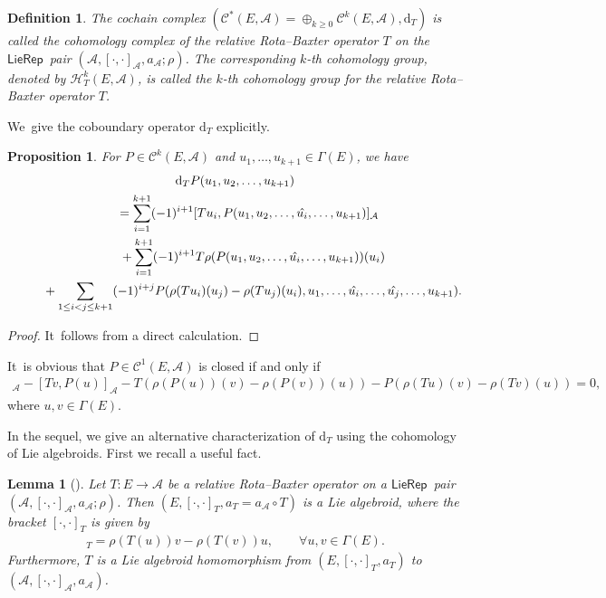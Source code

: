\documentclass[10pt,a4paper]{amsart}
\numberwithin{equation}{section}
\newtheorem{lem}[thm]{Lemma}
\newtheorem{pro}[thm]{Proposition}
\newtheorem{defi}[thm]{Definition}
\newcommand{\huaA}{\mathcal{A}}
\newcommand{\huaC}{\mathcal{C}}
\newcommand{\huaH}{\mathcal{H}}
\newcommand{\dM}{\mathrm{d}}
\newcommand{\LP}{$\mathsf{LieRep}$~}
\begin{document}
\begin{defi}\label{defi:cohomology of RB-operator}
The cochain complex $(\huaC^*(E,\huaA)=\oplus_{k\geq0}\huaC^k(E,\huaA),\dM_{T})$ is called
the {\it cohomology complex} of the relative Rota--Baxter operator $T$ on the \LP pair $(\huaA,[\cdot,\cdot]_\huaA,a_\huaA;\rho)$. The corresponding $k$-th cohomology group, denoted by $\huaH_{T}^k(E,\huaA)$, is called the {\it $k$-th cohomology group} for the relative Rota--Baxter operator $T$.
\end{defi}

We~give the coboundary operator $\dM_{T}$ explicitly.

\begin{pro}\label{pro:concret formula}
 For $P\in\huaC^k(E,\huaA)$ and $u_1,\dots,u_{k+1}\in\Gamma{(E)}$, we have
\begin{gather}
\dM_{T}P(u_1,u_2,\dots,u_{k+1})\nonumber
\\ \qquad
{}=\sum_{i=1}^{k+1}(-1)^{i+1}[Tu_i,P(u_1,u_2,\dots,\hat{u_i},\dots,u_{k+1})]_{\huaA}\nonumber
\\ \qquad\hphantom{=}
{}+\sum_{i=1}^{k+1}(-1)^{i+1}T\rho(P(u_1,u_2,\dots,\hat{u_i},\dots,u_{k+1}))(u_i)\nonumber
\\ \qquad\hphantom{=}
{}+\sum_{1\leq i<j\leq {k+1}}(-1)^{i+j}P(\rho(Tu_i)(u_j)-\rho(Tu_j)(u_i),u_1,\dots,\hat{u_i},\dots,\hat{u_j},\dots,u_{k+1}).
\label{eq:coboundary operator of RB-operator}
\end{gather}
\end{pro}

\begin{proof}
 It~follows from a direct calculation.
\end{proof}

It~is obvious that $P\in\huaC^1(E,\huaA)$ is closed if and only if
\begin{gather*}
[Tu,P(v)]_{\huaA}-[Tv,P(u)]_{\huaA}-T(\rho(P(u))(v)-\rho(P(v))(u))-P(\rho(Tu)(v)-\rho(Tv)(u))=0,
\end{gather*}
where $u,v\in\Gamma(E)$.

In the sequel, we give an alternative characterization of $\dM_{T}$ using the cohomology of Lie algebroids. First we recall a useful fact.

\begin{lem}[\cite{LiuShengBaiChen}]\label{lem:new Lie algebroid}
 Let $T\colon E\longrightarrow \huaA$ be a relative Rota--Baxter operator on a \LP pair $(\huaA,[\cdot,\cdot]_\huaA,a_\huaA;\rho)$. Then $(E,[\cdot,\cdot]_T,a_T=a_\huaA\circ T)$ is a Lie algebroid, where the bracket $[\cdot,\cdot]_T$ is given by
 \begin{gather*}
 [u,v]_T=\rho(T(u))v-\rho(T(v))u,\qquad\forall u,v\in\Gamma(E).
 \end{gather*}
 Furthermore, $T$ is a Lie algebroid homomorphism from $(E,[\cdot,\cdot]_T,a_T)$ to $(\huaA,[\cdot,\cdot]_\huaA,a_\huaA)$.
\end{lem}
\end{document}
